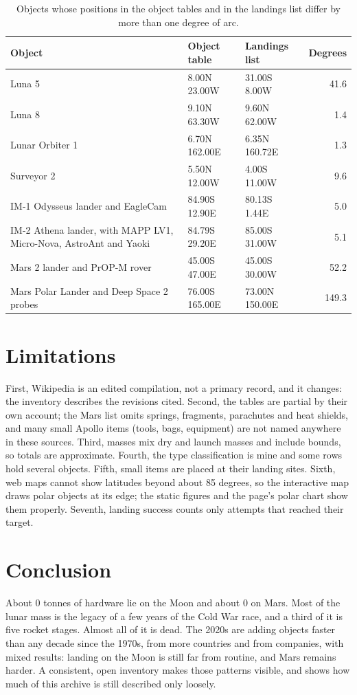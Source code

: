 \documentclass[11pt,a4paper]{article}
\begin{document}
\begin{table}[tbp]\centering\small\caption{Objects whose positions in the object tables and in the landings list differ by more than one degree of arc.}\label{tab:disagree}\begin{tabular}{p{6.2cm}llr}\toprule Object & Object table & Landings list & Degrees\\\midrule
Luna 5 & 8.00N 23.00W & 31.00S 8.00W & 41.6\\
Luna 8 & 9.10N 63.30W & 9.60N 62.00W & 1.4\\
Lunar Orbiter 1 & 6.70N 162.00E & 6.35N 160.72E & 1.3\\
Surveyor 2 & 5.50N 12.00W & 4.00S 11.00W & 9.6\\
IM-1 Odysseus lander and EagleCam & 84.90S 12.90E & 80.13S 1.44E & 5.0\\
IM-2 Athena lander, with MAPP LV1, Micro-Nova, AstroAnt and Yaoki & 84.79S 29.20E & 85.00S 31.00W & 5.1\\
Mars 2 lander and PrOP-M rover & 45.00S 47.00E & 45.00S 30.00W & 52.2\\
Mars Polar Lander and Deep Space 2 probes & 76.00S 165.00E & 73.00N 150.00E & 149.3\\
\bottomrule\end{tabular}\end{table}

\section{Limitations}
First, Wikipedia is an edited compilation, not a primary record, and it changes: the inventory describes the revisions cited. Second, the tables are partial by their own account; the Mars list omits springs, fragments, parachutes and heat shields, and many small Apollo items (tools, bags, equipment) are not named anywhere in these sources. Third, masses mix dry and launch masses and include bounds, so totals are approximate. Fourth, the type classification is mine and some rows hold several objects. Fifth, small items are placed at their landing sites. Sixth, web maps cannot show latitudes beyond about 85 degrees, so the interactive map draws polar objects at its edge; the static figures and the page's polar chart show them properly. Seventh, landing success counts only attempts that reached their target.

\section{Conclusion}
About 0 tonnes of hardware lie on the Moon and about 0 on Mars. Most of the lunar mass is the legacy of a few years of the Cold War race, and a third of it is five rocket stages. Almost all of it is dead. The 2020s are adding objects faster than any decade since the 1970s, from more countries and from companies, with mixed results: landing on the Moon is still far from routine, and Mars remains harder. A consistent, open inventory makes those patterns visible, and shows how much of this archive is still described only loosely.
\end{document}
